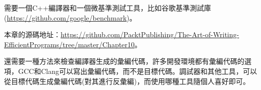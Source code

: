 
需要一個C++編譯器和一個微基準測試工具，比如谷歌基準測試庫(\url{https://github.com/google/benchmark})。

本章的源碼地址：\url{https://github.com/PacktPublishing/The-Art-of-Writing-EfficientPrograms/tree/master/Chapter10}。

還需要一種方法來檢查編譯器生成的彙編代碼，許多開發環境都有彙編代碼的選項，GCC和Clang可以寫出彙編代碼，而不是目標代碼。調試器和其他工具，可以從目標代碼生成彙編代碼(對其進行反彙編)，而使用哪種工具隨個人喜好即可。